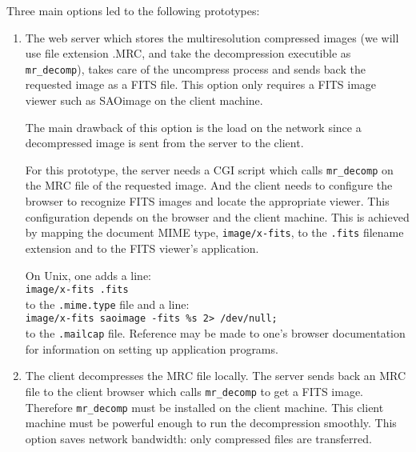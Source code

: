 Three main options led to the following prototypes:
 
\begin{enumerate}
 
\item The web server which stores the multiresolution compressed images
 (we will use file extension .MRC, and take the decompression executible 
 as \verb+mr_decomp+),
 takes care of the uncompress process and sends back the requested image as
 a FITS file. This option only requires a FITS image viewer such as 
 SAOimage on the client machine. 

The main drawback of this option is the load on the network since
a decompressed image is sent from the server to the client.
 
 For this prototype, the server needs a CGI script which calls
 \verb+mr_decomp+ on the MRC file of the requested image. And the client needs
 to configure the browser to recognize FITS images and locate the appropriate
 viewer. This configuration depends on the browser and the client machine.
  This is achieved by mapping the document MIME type, \verb+image/x-fits+,
 to the \verb+.fits+ filename extension and to the FITS viewer's application.
 
        On Unix, one  adds a line:\\
 \verb+image/x-fits .fits+\\
 to the \verb+.mime.type+ file and a line:\\
 \verb+image/x-fits saoimage -fits %s 2> /dev/null;+\\
 to the \verb+.mailcap+ file.
 Reference may be made to one's browser documentation for information on 
 setting up application programs.
 

\item   The client decompresses the MRC file locally. The server sends back an
 MRC file to the client browser which calls \verb+mr_decomp+ to get a FITS
 image.
 Therefore \verb+mr_decomp+ must be installed on the client machine. This
 client machine must be 
powerful enough to run the decompression smoothly.
 This option saves network bandwidth: only compressed files are
 transferred.


\end{enumerate}
